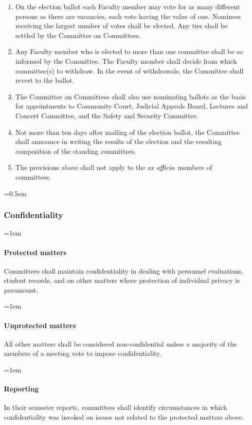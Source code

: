 \documentclass{manual}
\newcommand{\keyword}[1]{\textcolor{black}{#1}}
\newcommand{\exoff}{\keyword{\textit{ex officio}}~}
\let\oldsubsubsection\subsubsection
\renewcommand\subsubsection{\leftskip=0.5em\oldsubsubsection}
\let\oldparagraph\paragraph
\renewcommand\paragraph{\leftskip=1em\oldparagraph}
\newcommand{\itemLevelA}{\alph*.}
\newcommand{\itemRefA}{\alph*}
\begin{document}
\begin{enumerate}[label=\itemLevelA,ref=\itemRefA]
\item On the election ballot each Faculty member may vote for as many different persons as there are vacancies, each vote having the value of one. Nominees receiving the largest number of votes shall be elected. Any ties shall be settled by the Committee on Committees.

\item Any Faculty member who is elected to more than one committee shall be so informed by the Committee. The Faculty member shall decide from which committee(s) to withdraw. In the event of withdrawals, the Committee shall revert to the ballot.

\item \label{item:procedures07} The Committee on Committees shall also use nominating ballots as the basis for appointments to Community Court, Judicial Appeals Board, Lectures and Concert Committee, and the Safety and Security Committee.

\item Not more than ten days after mailing of the election ballot, the Committee shall announce in writing the results of the election and the resulting composition of the standing committees.

\item The provisions above shall not apply to the \exoff members of committees. 
\end{enumerate}


\subsubsection{Confidentiality}


\paragraph{Protected matters}
Committees shall maintain confidentiality in dealing with personnel evaluations, student records, and on other matters where protection of individual privacy is paramount.


\paragraph{Unprotected matters}
All other matters shall be considered non-confidential unless a majority of the members of a meeting vote to impose confidentiality.


\paragraph{Reporting}
In their semester reports, committees shall identify circumstances in which confidentiality was invoked on issues not related to the protected matters above.
\end{document}
